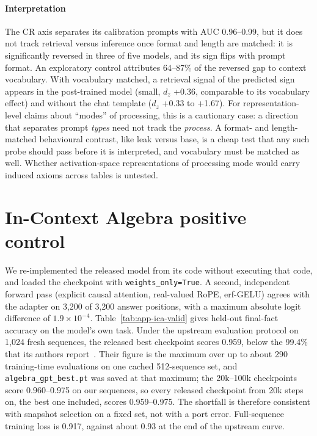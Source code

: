 \documentclass[11pt]{article}
\begin{document}
\paragraph{Interpretation}

The CR axis separates its calibration prompts with AUC 0.96--0.99, but it does not track retrieval versus inference once format and length are matched: it is significantly reversed in three of five models, and its sign flips with prompt format. An exploratory control attributes 64--87\% of the reversed gap to context vocabulary. With vocabulary matched, a retrieval signal of the predicted sign appears in the post-trained model (small, $d_z$ +0.36, comparable to its vocabulary effect) and without the chat template ($d_z$ +0.33 to +1.67). For representation-level claims about ``modes'' of processing, this is a cautionary case: a direction that separates prompt \emph{types} need not track the \emph{process}. A format- and length-matched behavioural contrast, like leak versus base, is a cheap test that any such probe should pass before it is interpreted, and vocabulary must be matched as well. Whether activation-space representations of processing mode would carry induced axioms across tables is untested.

\section{In-Context Algebra positive control}\label{app:ica}

We re-implemented the released model from its code without executing that code, and loaded the checkpoint with \texttt{weights\_only=True}. A second, independent forward pass (explicit causal attention, real-valued RoPE, erf-GELU) agrees with the adapter on 3,200 of 3,200 answer positions, with a maximum absolute logit difference of $1.9 \times 10^{-4}$. Table~\ref{tab:app-ica-valid} gives held-out final-fact accuracy on the model's own task. Under the upstream evaluation protocol on 1,024 fresh sequences, the released best checkpoint scores 0.959, below the 99.4\% that its authors report~\cite{todd2026ica}. Their figure is the maximum over up to about 290 training-time evaluations on one cached 512-sequence set, and \texttt{algebra\_gpt\_best.pt} was saved at that maximum; the 20k--100k checkpoints score 0.960--0.975 on our sequences, so every released checkpoint from 20k steps on, the best one included, scores 0.959--0.975. The shortfall is therefore consistent with snapshot selection on a fixed set, not with a port error. Full-sequence training loss is 0.917, against about 0.93 at the end of the upstream curve.
\end{document}
